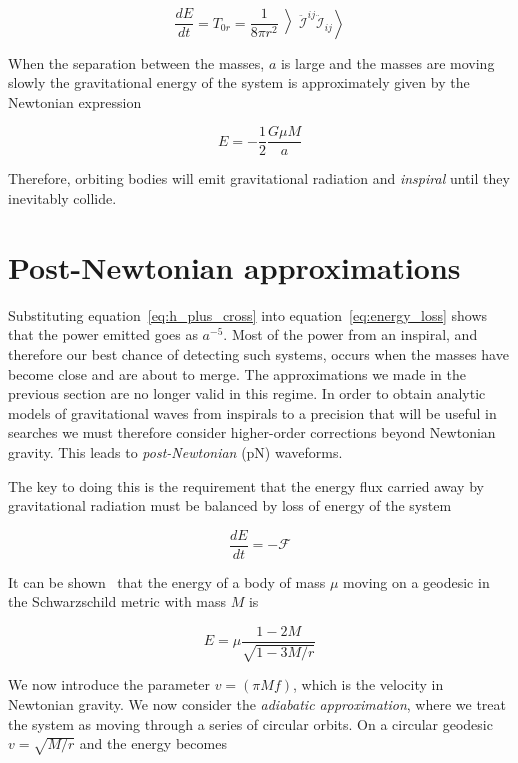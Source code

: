 \begin{equation}
\label{eq:energy_loss}
\frac{dE}{dt} = T_{0r} = \frac{1}{8 \pi r^2} \left\rangle \ddot{\mathcal{I}}^{ij}
\ddot{\mathcal{I}}_{ij} \right\rangle
\end{equation}

When the separation between the masses, $a$ is large and the masses are
moving slowly the gravitational energy of the system is approximately
given by the Newtonian expression

\begin{equation*}
E = - \frac{1}{2} \frac{G \mu M}{a}
\end{equation*}

Therefore, orbiting bodies will emit gravitational radiation and
\emph{inspiral} until they inevitably collide.

\section{Post-{N}ewtonian approximations}
\label{sec:PNWaveforms}

Substituting equation~\ref{eq:h_plus_cross} into
equation~\ref{eq:energy_loss} shows that the power emitted goes as
$a^{-5}$.  Most of the power from an inspiral, and therefore our best
chance of detecting such systems, occurs when the masses have become
close and are about to merge.  The approximations we made in the
previous section are no longer valid in this regime.  In order to
obtain analytic models of  gravitational waves from inspirals to a
precision that will be useful in searches we must therefore consider
higher-order corrections beyond Newtonian gravity.  This leads to
\emph{post-Newtonian} (pN) waveforms.

The key to doing this is the requirement that the energy flux carried
away by gravitational radiation must be balanced by loss of energy of the
system

\begin{equation}
\label{eq:equivilent_exchange}
\frac{dE}{dt} = - \mathcal{F}
\end{equation}

It can be shown~\cite{MTW} that the energy of a body of mass $\mu$ moving
on a geodesic in the Schwarzschild metric with mass $M$ is

\begin{equation}
\label{eq:hamiltonian}
E = \mu \frac{1-2M}{\sqrt{1-3M/r}} 
\end{equation}

We now introduce the parameter $v = (\pi M f)$, which is the velocity
in Newtonian gravity.  We now consider the \emph{adiabatic
approximation}, where we treat the system as moving through a series
of circular orbits.  On a circular geodesic $v= \sqrt{M/r}$ and the
energy becomes

